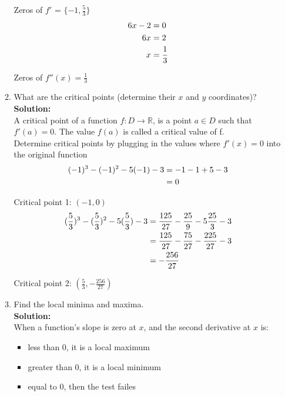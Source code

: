 \documentclass[a4paper]{article}
\begin{document}
\begin{enumerate}
\begin{enumerate}
Zeros of $f'$ = $\{-1,\frac{5}{3}\}$\\

\begin{align}
	6x - 2 &= 0\notag\\
	6x &= 2\notag\\
	x &= \frac{1}{3}\notag
\end{align}	
	
Zeros of $f''(x) = \frac{1}{3}$\\	
	
	\item What are the critical points (determine their $x$ and $y$ coordinates)?\\
	\textbf{Solution:}\\
	
A critical point of a function $f: D \rightarrow \mathbb{R}$, is a point $a \in D$ such that $f'(a) = 0$. The value $f(a)$ is called a critical value of f.\\


Determine critical points by plugging in the values where $f'(x) = 0$ into the original function\\



\begin{align*}
	(-1)^3 - (-1)^2 - 5(-1) - 3 &= -1 -1 +5 -3\notag\\
	&= 0
\end{align*}
	
Critical point 1: $(-1,0)$\\

\begin{align*}
	(\frac{5}{3})^3 - (\frac{5}{3})^2 - 5(\frac{5}{3}) - 3 &= \frac{125}{27} - \frac{25}{9} - 5\frac{25}{3} - 3\notag\\
	&= \frac{125}{27} - \frac{75}{27} - \frac{225}{27} - 3\notag\\
	&= -\frac{256}{27}
\end{align*}

Critical point 2: $(\frac{5}{3},-\frac{256}{27})$\\	
	
	\item Find the local minima and maxima.\\
	\textbf{Solution:}\\

When a function's slope is zero at $x$, and the second derivative at $x$ is:

\begin{itemize}
	\item less than 0, it is a local maximum
	\item greater than 0, it is a local minimum
	\item equal to 0, then the test failes
\end{itemize}


\end{enumerate}
\end{enumerate}
\end{document}
